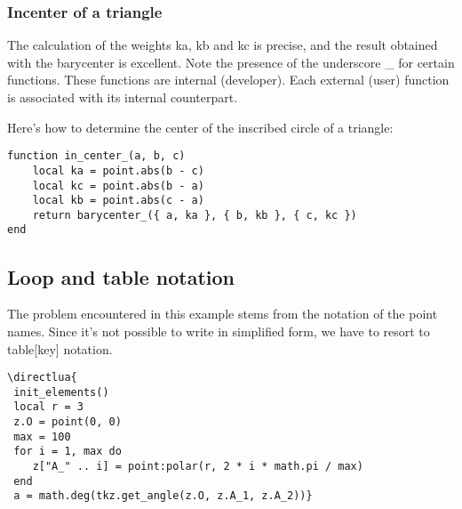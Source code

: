 \subsubsection{Incenter of a triangle}

The calculation of the weights ka, kb and kc is precise, and the result obtained with the barycenter is excellent. Note the presence of the underscore \_ for certain functions. These functions are internal (developer). Each external (user) function is associated with its internal counterpart.

Here's how to determine the center of the inscribed circle of a triangle:
\begin{mybox}
\begin{verbatim}
function in_center_(a, b, c)
	local ka = point.abs(b - c)
	local kc = point.abs(b - a)
	local kb = point.abs(c - a)
	return barycenter_({ a, ka }, { b, kb }, { c, kc })
end \end{verbatim}
\end{mybox}

\subsection{Loop and table notation}
\label{sub:loop_and_table_notation}
The problem encountered in this example stems from the notation of the point names. Since it's not possible to write in simplified form, we have to resort to table[key] notation.


\begin{center}
\end{center}

\begin{verbatim}
\directlua{
 init_elements()
 local r = 3
 z.O = point(0, 0)
 max = 100
 for i = 1, max do
 	z["A_" .. i] = point:polar(r, 2 * i * math.pi / max)
 end
 a = math.deg(tkz.get_angle(z.O, z.A_1, z.A_2))}
\end{verbatim}


